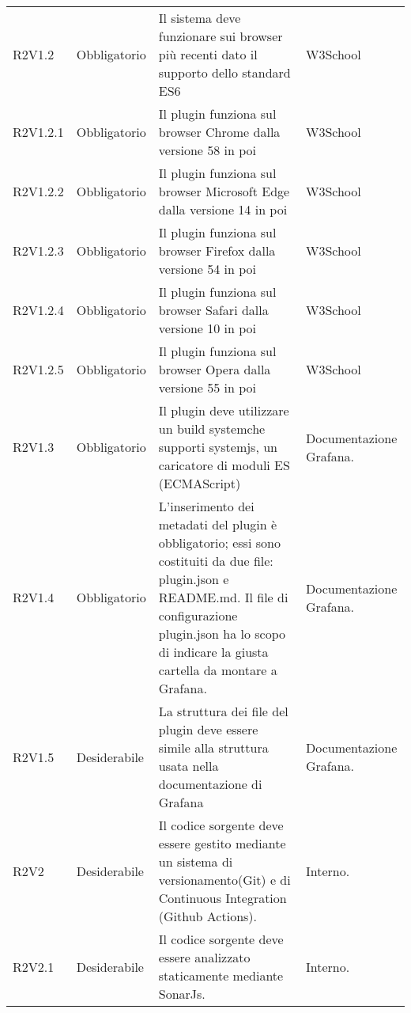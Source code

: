 \begin{longtable} {
		>{\centering}p{18mm} 
		>{\centering}p{28mm}
		>{}p{50mm} 
		>{}p{28mm}
		}
	R2V1.2 & 
	Obbligatorio & 
	Il sistema deve funzionare sui browser più recenti dato il supporto dello standard ES6 &
	W3School  \TBstrut \\ [2mm]
	
	R2V1.2.1 & 
	Obbligatorio & 
	Il plugin funziona sul browser Chrome dalla versione 58 in poi &
	W3School  \TBstrut \\ [2mm]
	
	R2V1.2.2 & 
	Obbligatorio & 
	Il plugin funziona sul browser Microsoft Edge dalla versione 14 in poi &
	W3School  \TBstrut \\ [2mm]
	
	R2V1.2.3 & 
	Obbligatorio & 
	Il plugin funziona sul browser Firefox dalla versione 54 in poi &
	W3School  \TBstrut \\ [2mm]
	
	R2V1.2.4 & 
	Obbligatorio & 
	Il plugin funziona sul browser Safari dalla versione 10 in poi &
	W3School  \TBstrut \\ [2mm]
	
	R2V1.2.5 & 
	Obbligatorio & 
	Il plugin funziona sul browser Opera dalla versione 55 in poi &
	W3School  \TBstrut \\ [2mm]
	
	R2V1.3 & 
	Obbligatorio & 
	Il plugin deve utilizzare un build system\glosp che supporti systemjs, un caricatore di moduli ES (ECMAScript) &
	Documentazione Grafana\glo.  \TBstrut \\ [2mm]

	R2V1.4 & 
	Obbligatorio & 
	L'inserimento dei metadati del plugin è obbligatorio; essi sono costituiti da due file: plugin.json e README.md. Il file di configurazione plugin.json ha lo scopo di indicare la giusta cartella da montare a Grafana\glo . &
	Documentazione Grafana\glo.  \TBstrut \\ [2mm]
	
	R2V1.5 &
	Desiderabile &
	La struttura dei file del plugin deve essere simile alla struttura usata nella documentazione di Grafana\glo &
	Documentazione Grafana\glo.  \TBstrut \\ [2mm]
		
	R2V2 &
	Desiderabile &
	Il codice sorgente deve essere gestito mediante un sistema di versionamento\glosp (Git) e di Continuous Integration (Github Actions). &
	Interno.  \TBstrut \\ [2mm]		
	
	R2V2.1 &
	Desiderabile &
	Il codice sorgente deve essere analizzato staticamente mediante SonarJs\glo . &
	Interno.  \TBstrut \\ [2mm]
	

\end{longtable}
